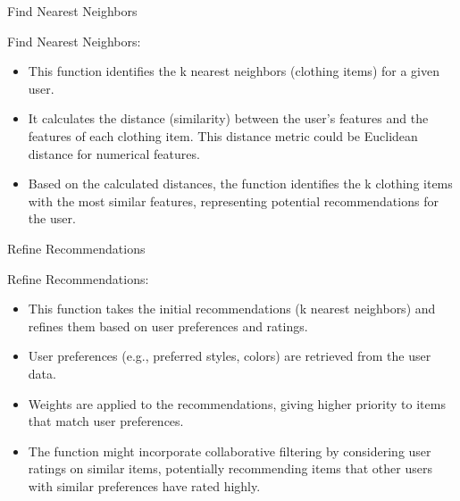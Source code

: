  \BlankLine
\begin{algorithm}[H]
  \SetAlgoLined


  \caption{Find Nearest Neighbors}
  \label{alg:find_nearest_neighbors}
  \BlankLine

\end{algorithm}
 \BlankLine
Find Nearest Neighbors:
 \BlankLine
\begin{itemize}
    \item This function identifies the k nearest neighbors (clothing items) for a given user.
    \item It calculates the distance (similarity) between the user's features and the features of each clothing item. This distance metric could be Euclidean distance for numerical features.
    \item Based on the calculated distances, the function identifies the k clothing items with the most similar features, representing potential recommendations for the user.
\end{itemize}
 \BlankLine
\begin{algorithm}[H]
  \SetAlgoLined


  \caption{Refine Recommendations}
  \label{alg:refine_recommendations}
  \BlankLine

\end{algorithm}
 \BlankLine
Refine Recommendations:
 \BlankLine
\begin{itemize}
    \item This function takes the initial recommendations (k nearest neighbors) and refines them based on user preferences and ratings.
    \item User preferences (e.g., preferred styles, colors) are retrieved from the user data.
    \item Weights are applied to the recommendations, giving higher priority to items that match user preferences.
    \item The function might incorporate collaborative filtering by considering user ratings on similar items, potentially recommending items that other users with similar preferences have rated highly.
     \BlankLine
\end{itemize}
